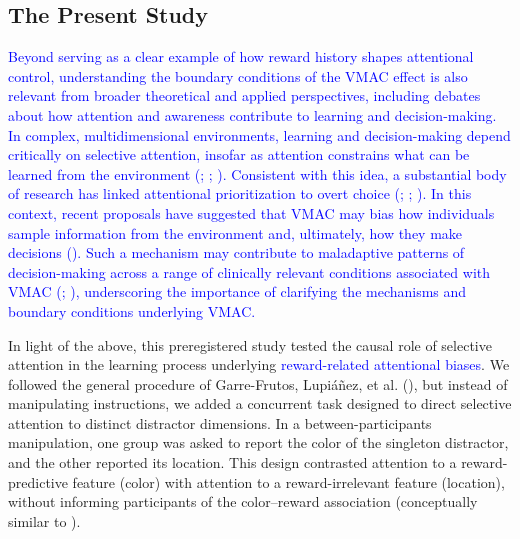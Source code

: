 \documentclass[
  man,
  floatsintext,
  longtable,
  nolmodern,
  notxfonts,
  notimes,
  mask,
  colorlinks=true,linkcolor=blue,citecolor=blue,urlcolor=blue]{apa7}
\begin{document}
\subsection{The Present Study}\label{the-present-study}

\textcolor{blue}{Beyond serving as a clear example of how reward history
shapes attentional control, understanding the boundary conditions of the
VMAC effect is also relevant from broader theoretical and applied
perspectives, including debates about how attention and awareness
contribute to learning and decision-making. In complex, multidimensional
environments, learning and decision-making depend critically on
selective attention, insofar as attention constrains what can be learned
from the environment (;
;
). Consistent with this
idea, a substantial body of research has linked attentional
prioritization to overt choice (; ;
). In this context,
recent proposals have suggested that VMAC may bias how individuals
sample information from the environment and, ultimately, how they make
decisions (). Such a
mechanism may contribute to maladaptive patterns of decision-making
across a range of clinically relevant conditions associated with VMAC
(;
), underscoring the
importance of clarifying the mechanisms and boundary conditions
underlying VMAC.}

In light of the above, this preregistered study tested the causal role
of selective attention in the learning process underlying
\textcolor{blue}{reward-related attentional biases}. We followed the
general procedure of Garre-Frutos, Lupiáñez, et al.
(), but instead of manipulating
instructions, we added a concurrent task designed to direct selective
attention to distinct distractor dimensions. In a between-participants
manipulation, one group was asked to report the color of the singleton
distractor, and the other reported its location. This design contrasted
attention to a reward-predictive feature (color) with attention to a
reward-irrelevant feature (location), without informing participants of
the color--reward association (conceptually similar to
).
\end{document}
